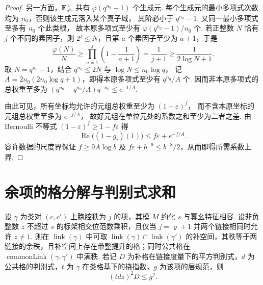 \begin{proof}
另一方面，$\mathbf F_{q^{n_0}}^\times$ 共有 $\varphi(q^{n_0}-1)$ 个生成元.
每个生成元的最小多项式次数均为 $n_0$，否则该生成元落入某个真子域，
其阶必小于 $q^{n_0}-1$. 又同一最小多项式至多有 $n_0$ 个此类根，
故本原多项式至少有 $\varphi(q^{n_0}-1)/n_0$ 个.
若正整数 $N$ 恰有 $j$ 个不同的素因子，则 $2^j\le N$，且第 $a$ 个素因子至少为 $a+1$，于是
\[
 \frac{\varphi(N)}{N}\ge
   \prod_{a=1}^j\left(1-\frac1{a+1}\right)=\frac1{j+1}
   \ge\frac1{2\log N+1}.
\]
取 $N=q^{n_0}-1$，结合 $q^{n_0}\le2N$ 与 $\log N\le n_0\log q$，
记 $A=2n_0(2n_0\log q+1)$，即得本原多项式至少有 $q^{n_0}/A$ 个.
因而非本原多项式的总权重至多为
$(q^{n_0}-q^{n_0}/A)q^{-n_0}\le e^{-1/A}$.

由此可见，所有坐标均允许的元组总权重至少为 $(1-\varepsilon)^f$，
而不含本原坐标的元组总权重至多为 $e^{-f/A}$，
故好元组在单位元处的系数之和至少为二者之差.
由 Bernoulli 不等式 $(1-\varepsilon)^f\ge1-f\varepsilon$ 得
\[
 \operatorname{Re}\bigl((1-g_i)(1)\bigr)\le f\varepsilon+e^{-f/A}.
\]
容许数据的尺度界保证 $f\ge9A\log b$ 及
$f\varepsilon+b^{-9}\le b^{-8}/2$，从而即得所需系数上界.
\end{proof}

\section{余项的格分解与判别式求和}
\label{sec:b-remainder}

\begin{lemma}[公共链接的正交分解]
\label{lem:b-link-splitting}
\emitthmsource
设 $\gamma$ 为类对 $(c,c')$ 上胞腔秩为 $j$ 的项，其模 $M$ 约化 $s$ 与幂幺特征相容.
设非负整数 $z$ 不超过 $s$ 的标架相交位范数乘积，且仅当 $j=\varrho+1$ 并两个链接相同时允许 $z\ne1$.
则在 $\operatorname{link}(\gamma)$ 中可取 $\operatorname{link}(\gamma)\cap\operatorname{link}(\gamma')$ 的补空间，其秩等于两链接的余秩，且补空间上存在带整提升的格；同时公共格在 $\operatorname{commonLink}(\gamma,\gamma')$ 中满秩. 若记 $D$ 为补格在链接度量下的平方判别式，$d$ 为公共格的判别式，$t$ 为 $\gamma$ 在类格基下的挠指数，$g$ 为该项的层规范，则
\[
 (tdz)^2D\le g^2.
\]
\end{lemma}

